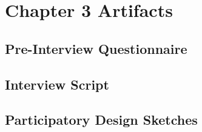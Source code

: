 \chapter{Chapter 3 Artifacts}
\label{chap3:artifacts}

\begin{appendices}

\section{Pre-Interview Questionnaire}



\section{Interview Script}


% 

\section{Participatory Design Sketches}




\end{appendices}
